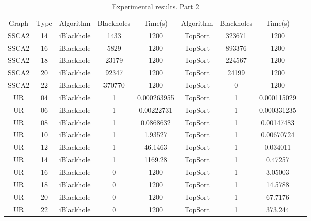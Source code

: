 \begin{table}[]
	\caption{Experimental results. Part 2}
	\label{tabular:tableresults2}
	\begin{center}
		\begin{tabular}{c|c|c|c|c|c|c|c|c}
			Graph & Type & Algorithm & Blackholes & Time(s) & Algorithm & Blackholes & Time(s) \\
			SSCA2 & 14 & iBlackhole & 1433 & 1200 & TopSort & 323671 & 1200 \\
			SSCA2 & 16 & iBlackhole & 5829 & 1200 & TopSort & 893376 & 1200 \\
			SSCA2 & 18 & iBlackhole & 23179 & 1200 & TopSort & 224567 & 1200 \\
			SSCA2 & 20 & iBlackhole & 92347 & 1200 & TopSort & 24199 & 1200 \\
			SSCA2 & 22 & iBlackhole & 370770 & 1200 & TopSort & 0 & 1200 \\
			UR & 04 & iBlackhole & 1 & 0.000263955 & TopSort & 1 & 0.000115029 \\
			UR & 06 & iBlackhole & 1 & 0.00222731 & TopSort & 1 & 0.000331235 \\
			UR & 08 & iBlackhole & 1 & 0.0868632 & TopSort & 1 & 0.00147483 \\
			UR & 10 & iBlackhole & 1 & 1.93527 & TopSort & 1 & 0.00670724 \\
			UR & 12 & iBlackhole & 1 & 46.1463 & TopSort & 1 & 0.034011 \\
			UR & 14 & iBlackhole & 1 & 1169.28 & TopSort & 1 & 0.47257 \\
			UR & 16 & iBlackhole & 0 & 1200 & TopSort & 1 & 3.05003 \\
			UR & 18 & iBlackhole & 0 & 1200 & TopSort & 1 & 14.5788 \\
			UR & 20 & iBlackhole & 0 & 1200 & TopSort & 1 & 67.7176 \\
			UR & 22 & iBlackhole & 0 & 1200 & TopSort & 1 & 373.244 \\
		\end{tabular}
	\end{center}
\end{table}
